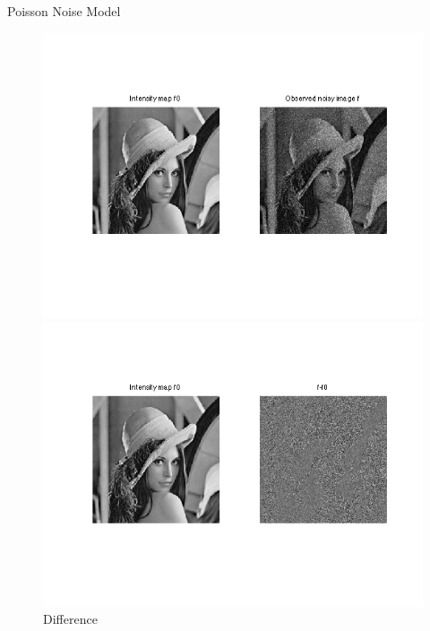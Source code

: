 \documentclass{beamer}
\begin{document}
\begin{frame}{Poisson Noise Model}
\begin{figure}[!tbp]
  \centering
  \begin{minipage}[b]{0.45\textwidth}
    \includegraphics[width=\textwidth]{poisson_img.png}
    \caption{Poisson Image addition}
  \end{minipage}
  \hfill
  \begin{minipage}[b]{0.45\textwidth}
    \includegraphics[width=\textwidth]{poisson_diff.png}
    \caption{Difference}
  \end{minipage}
\end{figure}
\end{frame}
\end{document}
